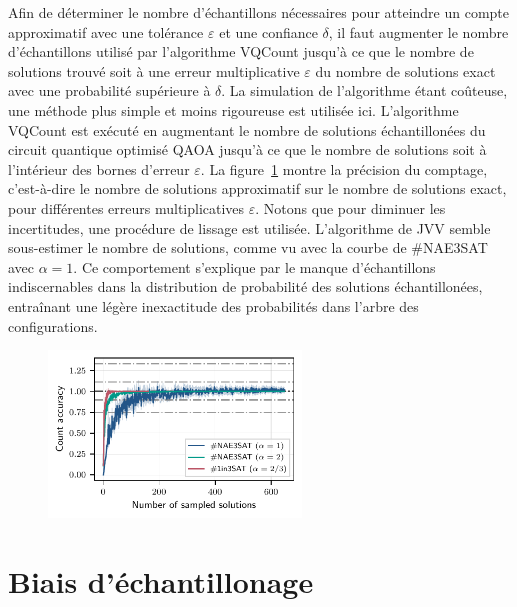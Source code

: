 Afin de déterminer le nombre d'échantillons nécessaires pour atteindre un compte approximatif avec une tolérance $\varepsilon$ et une confiance $\delta$, il faut augmenter le nombre d'échantillons utilisé par l'algorithme VQCount jusqu'à ce que le nombre de solutions trouvé soit à une erreur multiplicative $\varepsilon$ du nombre de solutions exact avec une probabilité supérieure à $\delta$. La simulation de l'algorithme étant coûteuse, une méthode plus simple et moins rigoureuse est utilisée ici. L'algorithme VQCount est exécuté en augmentant le nombre de solutions échantillonées du circuit quantique optimisé QAOA jusqu'à ce que le nombre de solutions soit à l'intérieur des bornes d'erreur $\varepsilon$. La figure~\ref{fig:count-accuracy.pdf} montre la précision du comptage, c'est-à-dire le nombre de solutions approximatif sur le nombre de solutions exact, pour différentes erreurs multiplicatives $\varepsilon$. Notons que pour diminuer les incertitudes, une procédure de lissage est utilisée. L'algorithme de JVV semble sous-estimer le nombre de solutions, comme vu avec la courbe de \#NAE3SAT avec $\alpha = 1$. Ce comportement s'explique par le manque d'échantillons indiscernables dans la distribution de probabilité des solutions échantillonées, entraînant une légère inexactitude des probabilités dans l'arbre des configurations. 

\begin{figure}[ht!]
    \centering
    \includegraphics[width=0.6\textwidth]{figures/count-accuracy.pdf}
    \caption{}
    \label{fig:count-accuracy.pdf}
\end{figure}


\section{Biais d'échantillonage}

